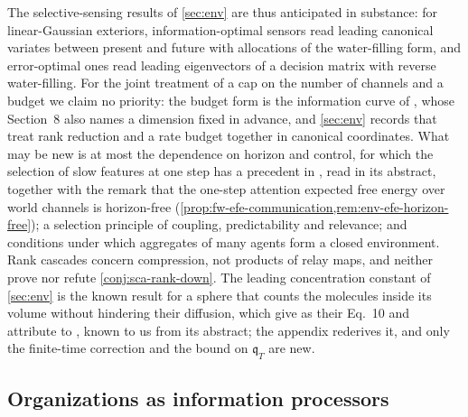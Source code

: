 The selective-sensing results of \cref{sec:env} are thus anticipated in substance: for linear-Gaussian exteriors, information-optimal sensors read leading canonical variates between present and future with allocations of the water-filling form, and error-optimal ones read leading eigenvectors of a decision matrix with reverse water-filling. For the joint treatment of a cap on the number of channels and a budget we claim no priority: the budget form is the information curve of \citet{chechik2005information}, whose Section~8 also names a dimension fixed in advance, and \cref{sec:env} records that \citet{scharf1998wiener} treat rank reduction and a rate budget together in canonical coordinates. What may be new is at most the dependence on horizon and control, for which the selection of slow features at one step has a precedent in \citet{creutzig2008predictive}, read in its abstract, together with the remark that the one-step attention expected free energy over world channels is horizon-free (\cref{prop:fw-efe-communication,rem:env-efe-horizon-free}); a selection principle of coupling, predictability and relevance; and conditions under which aggregates of many agents form a closed environment. Rank cascades concern compression, not products of relay maps, and neither prove nor refute \cref{conj:sca-rank-down}. The leading concentration constant of \cref{sec:env} is the known result for a sphere that counts the molecules inside its volume without hindering their diffusion, which \citet{mora2010limits} give as their Eq.~10 and attribute to \citet{berg1977physics}, known to us from its abstract; the appendix rederives it, and only the finite-time correction and the bound on $\mathfrak q_T$ are new.

\subsection{Organizations as information processors}\label{sec:rel-organizations}


